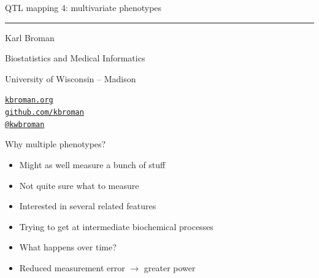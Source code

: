 \documentclass[12pt]{article}
\newcommand{\titlesize}{\fontsize{40}{50} \selectfont}
\newcommand{\headsize}{\fontsize{35}{35} \selectfont}
\newcommand{\textsize}{\fontsize{30}{35} \selectfont}
\newcommand{\smallsize}{\fontsize{25}{30} \selectfont}
\begin{document}
\thispagestyle{empty}

\begin{center}
\titlesize \color{myyellow}


\vspace*{15mm}

QTL mapping 4: multivariate phenotypes

\color{mypink}
\rule{10in}{1mm}

\vspace{5mm}

\textsize \color{myblue}
Karl Broman
\vspace{5mm}

\color{mywhite}
{\smallsize Biostatistics and Medical Informatics

University of Wisconsin -- Madison
\vspace{20mm}


\href{http://kbroman.org}{\tt kbroman.org} \\[3pt]
\href{https://github.com/kbroman}{\tt github.com/kbroman} \\
\href{https://twitter.com/kwbroman}{\tt @kwbroman}
}

\end{center}



\newpage

\headsize \color{myyellow}
\hfill \begin{minipage}{5.75in}
\centering
Why multiple phenotypes?
\end{minipage}

\vspace{30mm}

\color{mywhite} \smallsize

\hspace*{0.5in}
\begin{minipage}[t]{9.5in}
  \begin{itemize}
    \itemsep12pt
  \item Might as well measure a bunch of stuff
  \item Not quite sure what to measure
  \item Interested in several related features
  \item Trying to get at intermediate biochemical processes
  \item What happens over time?
  \item Reduced measurement error $\rightarrow$ greater power
  \end{itemize}
\end{minipage}
\end{document}
